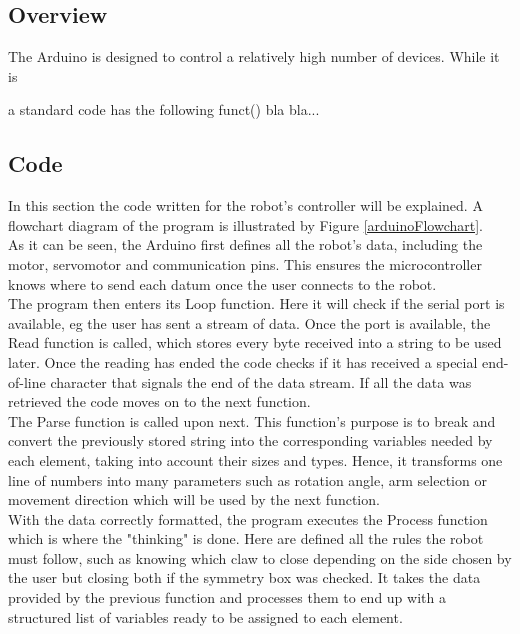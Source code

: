 \subsection{Overview}
The Arduino is designed to control a relatively high number of devices. While it is 


a standard code has the following funct() bla bla...

\newpage
\subsection{Code}

In this section the code written for the robot's controller will be explained. A flowchart diagram of the program is illustrated by Figure \ref{arduinoFlowchart}.\\

As it can be seen, the Arduino first defines all the robot's data, including the motor, servomotor and communication pins. This ensures the microcontroller knows where to send each datum once the user connects to the robot.\\

The program then enters its Loop function. Here it will check if the serial port is available, eg the user has sent a stream of data. Once the port is available, the Read function is called, which stores every byte received into a string to be used later. Once the reading has ended the code checks if it has received a special end-of-line character that signals the end of the data stream. If all the data was retrieved the code moves on to the next function.\\

The Parse function is called upon next. This function's purpose is to break and convert the previously stored string into the corresponding variables needed by each element, taking into account their sizes and types. Hence, it transforms one line of numbers into many parameters such as rotation angle, arm selection or movement direction which will be used by the next function.\\

With the data correctly formatted, the program executes the Process function which is where the "thinking" is done. Here are defined all the rules the robot must follow, such as knowing which claw to close depending on the side chosen by the user but closing both if the symmetry box was checked. It takes the data provided by the previous function and processes them to end up with a structured list of variables ready to be assigned to each element.\\

